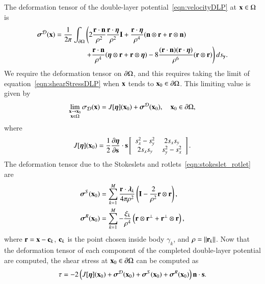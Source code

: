 \documentclass[preprint, 10pt]{elsarticle}
\begin{document}
The deformation tensor of the double-layer
potential~\eqref{eqn:velocityDLP} at ${\mathbf{x}} \in \Omega$ is
\begin{equation}
  \label{eqn:shearStressDLP}
  \begin{aligned}
  {\boldsymbol\sigma}^{\mathcal{D}}({\mathbf{x}}) = \frac{1}{2\pi}\int_{{\partial}\Omega} &\left(
    2\frac{{\mathbf{r}} \cdot {\mathbf{n}}}{\rho^2} \frac{{\mathbf{r}} \cdot {\boldsymbol\eta}}{\rho^2} {\mathbf{I}} + 
    \frac{{\mathbf{r}} \cdot {\boldsymbol\eta}}{\rho^4} ({\mathbf{n}} \otimes {\mathbf{r}} + {\mathbf{r}} \otimes {\mathbf{n}}) 
    \right. \\
    &\left.
    +\frac{{\mathbf{r}} \cdot {\mathbf{n}}}{\rho^4} ({\boldsymbol\eta} \otimes {\mathbf{r}} + {\mathbf{r}} \otimes {\boldsymbol\eta}) - 
    8\frac{({\mathbf{r}} \cdot {\mathbf{n}})({\mathbf{r}} \cdot {\boldsymbol\eta})}{\rho^6}({\mathbf{r}} \otimes {\mathbf{r}})
  \right) ds_{\mathbf{y}}.
  \end{aligned}
\end{equation}
We require the deformation tensor on ${\partial}\Omega$, and this requires
taking the limit of equation~\eqref{eqn:shearStressDLP} when ${\mathbf{x}}$ tends
to ${\mathbf{x}}_0 \in {\partial}\Omega$.  This limiting value is given
by~\cite{qua-bir2014a}
\begin{align*}
  \lim_{\substack{{\mathbf{x}} \rightarrow {\mathbf{x}}_0 \\ {\mathbf{x}} \in \Omega}}\sigma_{\mathcal{D}}({\mathbf{x}}) =
  J[{\boldsymbol\eta}]({\mathbf{x}}_0) + {\boldsymbol\sigma}^{\mathcal{D}}({\mathbf{x}}_0), \quad {\mathbf{x}}_0 \in {\partial}\Omega,
\end{align*} 
where
\begin{align*}
  J[{\boldsymbol\eta}]({\mathbf{x}}_0) = \frac{1}{2}\frac{\partial {\boldsymbol\eta}}{\partial {\mathbf{s}}} \cdot {\mathbf{s}}
  \left[ \begin{array}{cc}
    s_x^2 - s_y^2 & 2s_x s_y \\ 2s_x s_y & s_y^2 - s_x^2
  \end{array}\right].
\end{align*}
The deformation tensor due to the Stokeslets and
rotlets~\eqref{eqn:stokeslet_rotlet} are
\begin{align*}
  {\boldsymbol\sigma}^S({\mathbf{x}}_0) &= \sum_{k=1}^{M}
    \frac{{\mathbf{r}} \cdot {\boldsymbol\lambda}_k}{4\pi\rho^2} \left(
    {\mathbf{I}} - \frac{2}{\rho^2} {\mathbf{r}} \otimes {\mathbf{r}} \right),  \\
  {\boldsymbol\sigma}^R({\mathbf{x}}_0) &= \sum_{k=1}^M
    -\frac{\xi_k}{\rho^4} \left({\mathbf{r}} \otimes {\mathbf{r}}^\perp + 
    {\mathbf{r}}^\perp \otimes {\mathbf{r}} \right),
\end{align*}
where ${\mathbf{r}} = {\mathbf{x}} - {\mathbf{c}}_k$, ${\mathbf{c}}_k$ is the point chosen inside body
$\gamma_k$, and $\rho = \|{\mathbf{r}}_k\|$.  Now that the deformation tensor of
each component of the completed double-layer potential are computed, the
shear stress at ${\mathbf{x}}_0 \in {\partial}\Omega$ can be computed as
\begin{align*}
  \tau = -2 \left(J[{\boldsymbol\eta}]({\mathbf{x}}_0) + {\boldsymbol\sigma}^{\mathcal{D}}({\mathbf{x}}_0) + 
    {\boldsymbol\sigma}^S({\mathbf{x}}_0) + {\boldsymbol\sigma}^R({\mathbf{x}}_0)\right) {\mathbf{n}} \cdot {\mathbf{s}}.
\end{align*}
\end{document}
